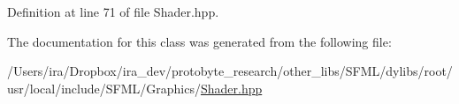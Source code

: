 Definition at line 71 of file Shader.\-hpp.



The documentation for this class was generated from the following file\-:\begin{DoxyCompactItemize}
\item 
/\-Users/ira/\-Dropbox/ira\-\_\-dev/protobyte\-\_\-research/other\-\_\-libs/\-S\-F\-M\-L/dylibs/root/usr/local/include/\-S\-F\-M\-L/\-Graphics/\hyperlink{_shader_8hpp}{Shader.\-hpp}\end{DoxyCompactItemize}
